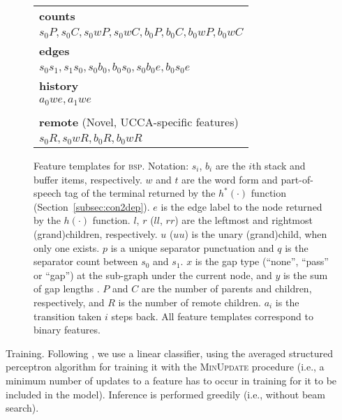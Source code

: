 \documentclass[11pt]{article}
\makeatletter
\newcommand{\secref}[1]{Section~\ref{#1}}
\renewcommand{\paragraph}{
  \@startsection{paragraph}{4}
  {\z@}{.5ex \@plus .5ex \@minus .2ex}{-1em}
  {\normalfont\normalsize\bfseries}
}
\makeatother
\begin{document}
\begin{figure}
\begin{adjustbox}{margin=3pt,frame}
\begin{tabular}{>{\small}l}
\textbf{counts} \\
$s_0P, s_0C, s_0wP, s_0wC, b_0P, b_0C, b_0wP, b_0wC$ \\
\textbf{edges} \\
$s_0s_1, s_1s_0, s_0b_0, b_0s_0, s_0b_0e, b_0s_0e$ \\
\textbf{history} \\
$a_0we, a_1we$ \\
\\
\textbf{remote} (Novel, UCCA-specific features) \\
$s_0R, s_0wR, b_0R, b_0wR$
\end{tabular}
\end{adjustbox}

\caption{\label{fig:features}
  Feature templates for \textsc{bsp}. Notation:
  $s_i$, $b_i$ are the $i$th stack and buffer items, respectively.
  $w$ and $t$ are the word form and part-of-speech tag of the terminal returned by the $h^*(\cdot)$ function (\secref{subsec:con2dep}).
  $e$ is the edge label to the node returned by the $h(\cdot)$ function.
  $l$, $r$ ($ll$, $rr$) are the leftmost and rightmost (grand)children, respectively.
  $u$ ($uu$) is the unary (grand)child, when only one exists.
  $p$ is a unique separator punctuation and $q$ is the separator count between $s_0$ and $s_1$.
  $x$ is the gap type (``none'', ``pass'' or ``gap'') at the sub-graph under the current node, and $y$ is the sum of gap lengths \protect\cite{maier2009characterizing}.
  $P$ and $C$ are the number of parents and children, respectively, and $R$ is the number of remote children.
  $a_i$ is the transition taken $i$ steps back.
  All feature templates correspond to binary features.
}
\end{figure}

\paragraph{Training.}
Following , we use a linear classifier, using
the averaged structured perceptron algorithm for training it
\cite{Coll:04} with the \textsc{MinUpdate} \cite{cai2011language} procedure
(i.e., a minimum number of updates to a feature has to occur in training for it
to be included in the model). Inference is performed greedily (i.e., without beam search).
\end{document}
